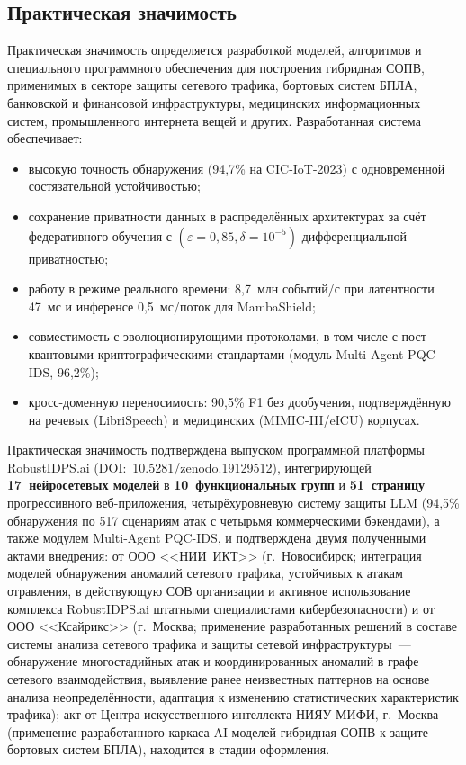 \documentclass[12pt,a5paper]{article}
\begin{document}
\subsection*{Практическая значимость}

Практическая значимость определяется разработкой моделей,
алгоритмов и специального программного обеспечения для
построения гибридная СОПВ, применимых в секторе защиты сетевого
трафика, бортовых систем БПЛА, банковской и финансовой
инфраструктуры, медицинских информационных систем, промышленного
интернета вещей и других. Разработанная система обеспечивает:

\begin{itemize}
\item высокую точность обнаружения (94,7\% на CIC-IoT-2023)
с одновременной состязательной устойчивостью;
\item сохранение приватности данных в распределённых
архитектурах за счёт федеративного обучения с
$(\varepsilon{=}0{,}85,\delta{=}10^{-5})$ дифференциальной
приватностью;
\item работу в режиме реального времени: 8,7~млн событий/с при
латентности 47~мс и инференсе 0,5~мс/поток для MambaShield;
\item совместимость с эволюционирующими протоколами, в том
числе с пост-квантовыми криптографическими стандартами
(модуль Multi-Agent PQC-IDS, 96,2\%);
\item кросс-доменную переносимость: 90,5\% F1 без дообучения,
подтверждённую на речевых (LibriSpeech) и медицинских
(MIMIC-III/eICU) корпусах.
\end{itemize}

Практическая значимость подтверждена выпуском
программной платформы RobustIDPS.ai (DOI:~10.5281/zenodo.19129512),
интегрирующей \textbf{17~нейросетевых моделей} в
\textbf{10~функциональных групп} и \textbf{51~страницу}
прогрессивного веб-приложения, четырёхуровневую систему защиты
LLM (94,5\% обнаружения по 517 сценариям атак с четырьмя
коммерческими бэкендами), а также модулем Multi-Agent PQC-IDS,
и подтверждена двумя полученными актами внедрения: от ООО
<<НИИ~ИКТ>> (г.~Новосибирск; интеграция моделей обнаружения
аномалий сетевого трафика, устойчивых к атакам отравления, в
действующую СОВ организации и активное использование комплекса
RobustIDPS.ai штатными специалистами кибербезопасности) и от ООО
<<Ксайрикс>> (г.~Москва; применение разработанных решений в
составе системы анализа сетевого трафика и защиты сетевой
инфраструктуры~--- обнаружение многостадийных атак и
координированных аномалий в графе сетевого взаимодействия,
выявление ранее неизвестных паттернов на основе анализа
неопределённости, адаптация к изменению статистических
характеристик трафика); акт от Центра искусственного интеллекта
НИЯУ МИФИ, г.~Москва (применение разработанного каркаса
AI-моделей гибридная СОПВ к защите бортовых систем БПЛА),
находится в стадии оформления.
\end{document}
